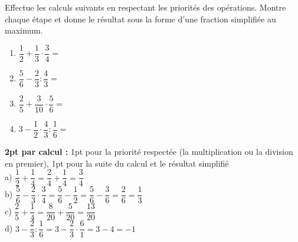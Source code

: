 
\question[8]
Effectue les calculs suivants en respectant les priorités des opérations. Montre chaque étape et donne le résultat sous la forme d'une fraction simplifiée au maximum.

\vspace{10pt}
\begin{enumerate}[leftmargin=*,align=parleft, label=\alph*), itemsep=60pt]
\item $\dfrac{1}{2} + \dfrac{1}{3} \cdot \dfrac{3}{4} =$ 
\item $\dfrac{5}{6} - \dfrac{2}{3} : \dfrac{4}{3} =$ 
\item $\dfrac{2}{5} + \dfrac{3}{10} \cdot \dfrac{5}{6} =$ 
\item $3 - \dfrac{1}{2} \cdot \dfrac{4}{3} : \dfrac{1}{6} =$ 
\end{enumerate}

\begin{solution}[0pt]
\textbf{2pt par calcul :} 1pt pour la priorité respectée (la multiplication ou la division en premier), 1pt pour la suite du calcul et le résultat simplifié\\[8pt]
a) $\dfrac{1}{2} + \dfrac{1}{4} = \dfrac{2}{4} + \dfrac{1}{4} = \dfrac{3}{4}$\\[6pt]
b) $\dfrac{5}{6} - \dfrac{2}{3} \cdot \dfrac{3}{4} = \dfrac{5}{6} - \dfrac{1}{2} = \dfrac{5}{6} - \dfrac{3}{6} = \dfrac{2}{6} = \dfrac{1}{3}$\\[6pt]
c) $\dfrac{2}{5} + \dfrac{1}{4} = \dfrac{8}{20} + \dfrac{5}{20} = \dfrac{13}{20}$\\[6pt]
d) $3 - \dfrac{2}{3} : \dfrac{1}{6} = 3 - \dfrac{2}{3} \cdot \dfrac{6}{1}  = 3 - 4 = -1$
\end{solution}